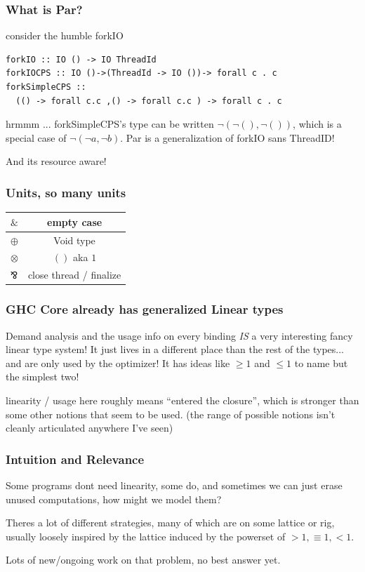\documentclass[11pt,reqno]{beamer}
\begin{document}
\begin{frame}[fragile]\frametitle{What is Par?}
consider the humble forkIO

\begin{verbatim}
forkIO :: IO () -> IO ThreadId
forkIOCPS :: IO ()->(ThreadId -> IO ())-> forall c . c
forkSimpleCPS ::
  (() -> forall c.c ,() -> forall c.c ) -> forall c . c
\end{verbatim}
hrmmm ... forkSimpleCPS's type can be written \( \neg (\neg (), \neg ()) \),
which is a special case of \( \neg (\neg a , \neg b) \). Par is a generalization of
forkIO sans ThreadID!

And its resource aware!

\end{frame}




\begin{frame}[fragile]\frametitle{Units, so many units}

\begin{tabular}{lc}
 \( \& \) & empty case \\ \hline
\( \oplus \) & Void type \\ \hline
\( \otimes \) & \( () \) aka \(1 \) \\ \hline
\( \invamp \) & close thread / finalize
\end{tabular}


\end{frame}

\begin{frame}\frametitle{GHC Core already has generalized Linear types}

Demand analysis and the usage info on every binding \emph{IS} a very interesting
fancy linear type system! It just lives in a different place than the rest of the
types... and are only used by the optimizer! It has ideas like \( \geq1 \) and \( \leq 1 \)
to name but the simplest two!

linearity / usage here roughly means ``entered the closure'', which is stronger
than some other notions that seem to be used.
(the range of possible notions isn't cleanly articulated anywhere I've seen)

\end{frame}


\begin{frame}\frametitle{Intuition and Relevance}
Some programs dont need linearity, some do, and sometimes we can just erase unused
computations, how might we model them?

Theres a lot of different strategies, many of which are on some lattice or rig,
usually loosely inspired by the lattice induced by the powerset of
 \(  >1, \equiv 1,  <1 \).

 Lots of new/ongoing work on that problem, no best answer yet.


\end{frame}
\end{document}
